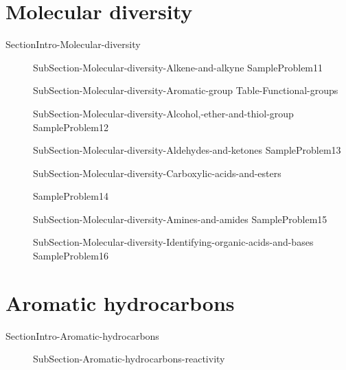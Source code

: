 \documentclass[main.tex]{subfiles}
\newcommand\chapterlabel{Ch-orgo}\setcounter{figurenewcounter}{0}\setcounter{tablenewcounter}{0}\setcounter{formulanewcounter}{0}
\begin{document}
\section{Molecular diversity}{SectionIntro-Molecular-diversity}
\sloppy\begin{description}
\item[]{SubSection-Molecular-diversity-Alkene-and-alkyne}
{SampleProblem11}
 \item[]{SubSection-Molecular-diversity-Aromatic-group}
 {Table-Functional-groups}
\item[]{SubSection-Molecular-diversity-Alcohol,-ether-and-thiol-group}
{SampleProblem12}
\item[] {SubSection-Molecular-diversity-Aldehydes-and-ketones}
{SampleProblem13}
\item[]{SubSection-Molecular-diversity-Carboxylic-acids-and-esters}

{SampleProblem14}

 \item[] {SubSection-Molecular-diversity-Amines-and-amides}
{SampleProblem15}
\item[]{SubSection-Molecular-diversity-Identifying-organic-acids-and-bases}
{SampleProblem16}
 \end{description}
 
 
 
 \section{Aromatic hydrocarbons}{SectionIntro-Aromatic-hydrocarbons}
\sloppy\begin{description}
 \item[] {SubSection-Aromatic-hydrocarbons-reactivity}
 \end{description}
\checkoddpage\ifoddpage \clearpage\thispagestyle{empty}\mbox{}\clearpage \else  \fi 
\end{document}
